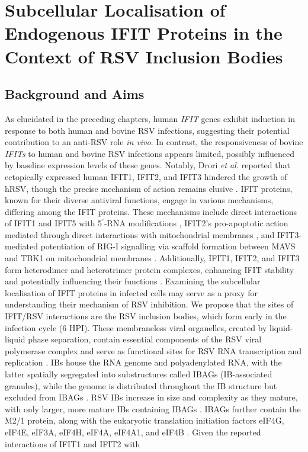 \chapter{Subcellular Localisation of Endogenous IFIT Proteins in the Context of RSV Inclusion Bodies} \label{ch:Subcellular Localisation of Endogenous IFIT Proteins in the Context of RSV Inclusion Bodies}
\section{Background and Aims} \label{sec:Background and Aims-Chapter3}
As elucidated in the preceding chapters, human \textit{IFIT} genes exhibit induction in response to both human and bovine RSV infections, suggesting their potential contribution to an anti-RSV role \textit{in vivo}. In contrast, the responsiveness of bovine \textit{IFITs} to human and bovine RSV infections appears limited, possibly influenced by baseline expression levels of these genes. Notably, Drori \textit{et al.} reported that ectopically expressed human IFIT1, IFIT2, and IFIT3 hindered the growth of hRSV, though the precise mechanism of action remains elusive \cite{Drori2020InfluenzaProteins}. IFIT proteins, known for their diverse antiviral functions, engage in various mechanisms, differing among the IFIT proteins. These mechanisms include direct interactions of IFIT1 and IFIT5 with 5$^{\prime}$-RNA modifications \cite{Abbas2013StructuralProteins, Diamond2014IFIT1:Translation}, IFIT2's pro-apoptotic action mediated through direct interactions with mitochondrial membranes \cite{Chen2017InhibitionApoptosis}, and IFIT3-mediated potentiation of RIG-I signalling via scaffold formation between MAVS and TBK1 on mitochondrial membranes \cite{Liu2011IFN-InducedTBK1}. Additionally, IFIT1, IFIT2, and IFIT3 form heterodimer and heterotrimer protein complexes, enhancing IFIT stability and potentially influencing their functions \cite{Mears2018BetterResponse}. Examining the subcellular localisation of IFIT proteins in infected cells may serve as a proxy for understanding their mechanism of RSV inhibition. We propose that the sites of IFIT/RSV interactions are the RSV inclusion bodies, which form early in the infection cycle (6 HPI). These membraneless viral organelles, created by liquid-liquid phase separation, contain essential components of the RSV viral polymerase complex and serve as functional sites for RSV RNA transcription and replication \cite{Rincheval2017FunctionalVirus, Weber1995NonstructuralSerum, Fricke2013P38Assembly, Jobe2021BovineResponses}. IBs house the RNA genome and polyadenylated RNA, with the latter spatially segregated into substructures called IBAGs (IB-associated granules), while the genome is distributed throughout the IB structure but excluded from IBAGs \cite{Rincheval2017FunctionalVirus}. RSV IBs increase in size and complexity as they mature, with only larger, more mature IBs containing IBAGs \cite{Rincheval2017FunctionalVirus, Jobe2021BovineResponses}. IBAGs further contain the M2/1 protein, along with the eukaryotic translation initiation factors eIF4G, eIF4E, eIF3A, eIF4H, eIF4A, eIF4A1, and eIF4B \cite{Rincheval2017FunctionalVirus, Jobe2023ViralCondensates}. Given the reported interactions of IFIT1 and IFIT2 with 